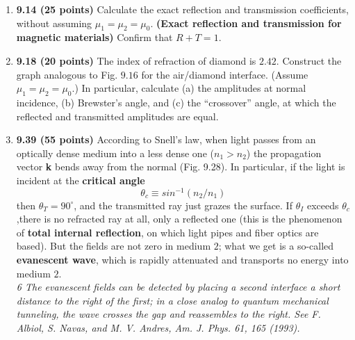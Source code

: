 \documentclass[fleqn]{article}
\begin{document}
  \begin{enumerate}
    \item \textbf{9.14 (25 points)} Calculate the exact reflection and transmission coefficients, without assuming $\mu_1=\mu_2=\mu_0$.
     \textbf{(Exact reflection and transmission for magnetic materials)}
    Confirm that $R+T=1$.


    \item \textbf{9.18 (20 points)} The index of refraction of diamond is $2.42$. Construct the graph analogous to Fig. $9.16$ for the air/diamond 
    interface. (Assume  $\mu_1=\mu_2=\mu_0$.) In particular, calculate (a) the amplitudes at normal incidence, (b) Brewster’s angle, and (c)
    the “crossover” angle, at which the reflected and transmitted amplitudes are equal.


    \item \textbf{9.39 (55 points)} According to Snell’s law, when light passes from an optically dense medium into a less dense one ($n_1 > n_2$) the 
    propagation vector \textbf{k} bends away from the normal (Fig. 9.28). In particular, if the light is incident at the \textbf{critical angle}
    $$
      \theta_c \equiv sin^{-1} \left(n_2/n_1\right)
    $$
    then $\theta_T=90^{\circ}$,  and the transmitted ray just grazes the surface. If $\theta_I$ exceeds $\theta_c$,there is no refracted ray at all, only a 
    reflected one (this is the phenomenon of \textbf{total internal reflection}, on which light pipes and fiber optics are based). But the fields are 
    not zero in medium $2$; what we get is a so-called \textbf{evanescent wave}, which is rapidly attenuated and transports no energy into medium $2$.
    \\
    \emph{6 The evanescent fields can be detected by placing a second interface a short distance to the right of
    the first; in a close analog to quantum mechanical tunneling, the wave crosses the gap and reassembles
    to the right. See F. Albiol, S. Navas, and M. V. Andres, Am. J. Phys. 61, 165 (1993).}


\end{enumerate}
\end{document}
